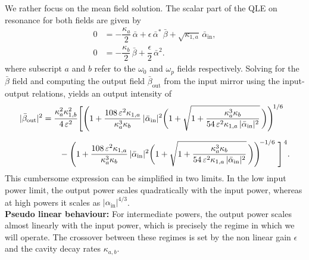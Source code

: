 We rather focus on the mean field solution. The scalar part of the QLE on resonance for both fields are given by 
 \begin{equation}
  \begin{split}
0 &= -\dfrac{\kappa_a}{2}\,\bar{\alpha} 
    + \epsilon\,\bar{\alpha}^{*}\,\bar{\beta} 
    + \sqrt{\kappa_{1,a}}\,\bar{\alpha}_{\mathrm{in}}, \\[6pt]
0 &= -\dfrac{\kappa_b}{2}\,\bar{\beta} 
    + \dfrac{\epsilon}{2}\,\bar{\alpha}^{2}.
  \end{split}
  \end{equation}
where subscript $a$ and $b$ refer to the $\omega_0$ and $\omega_p$ fields respectively. Solving for the $\bar{\beta}$ field and computing the output field $\bar{\beta}_{\mathrm{out}}$ from the input mirror using the input-output relations, yields an output intensity of 
\begin{align}
|\bar{\beta}_{\rm out}|^2
&= \frac{\kappa_{a}^{2}\kappa_{1,b}^{2}}{4\,\varepsilon^{2}}
\Bigg[
\Bigg(1+\frac{108\,\varepsilon^{2}\kappa_{1,a}}{\kappa_a^{3}\kappa_b}\,|\bar{\alpha}_{\rm in}|^{2}
\bigg(1+\sqrt{1+\frac{\kappa_a^{3}\kappa_b}{54\,\varepsilon^{2}\kappa_{1,a}\,|\bar{\alpha}_{\rm in}|^{2}}} \, \bigg)\Bigg)^{\!1/6} \nonumber \\[6pt]
&\qquad -
\Bigg(1+\frac{108\,\varepsilon^{2}\kappa_{1,a}}{\kappa_a^{3}\kappa_b}\,|\bar{\alpha}_{\rm in}|^{2}
\bigg(1+\sqrt{1+\frac{\kappa_a^{3}\kappa_b}{54\,\varepsilon^{2}\kappa_{1,a}\,|\bar{\alpha}_{\rm in}|^{2}}} \, \bigg)\Bigg)^{\!-1/6 \, }
\, \Bigg]^{\, 4}.
\end{align}
This cumbersome expression can be simplified in two limits. In the low input power limit, the output power scales quadratically with the input power, whereas at high powers it scales as $|\alpha_{\mathrm{in}}|^{4/3}$. \\
\textbf{Pseudo linear behaviour:} For intermediate powers, the output power scales almost linearly with the input power, which is precisely the regime in which we will operate. The crossover between these regimes is set by the non linear gain $\epsilon$ and the cavity decay rates $\kappa_{a,b}$.




